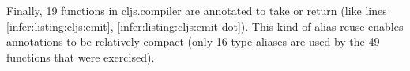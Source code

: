 Finally, 19 functions in cljs.compiler are annotated to 
take or return  (like lines \ref{infer:listing:cljs:emit}, \ref{infer:listing:cljs:emit-dot}).
This kind of alias reuse enables annotations
to be relatively compact (only 16 type aliases are used by the
49 functions that were exercised).

%
%
%
%
%
%

